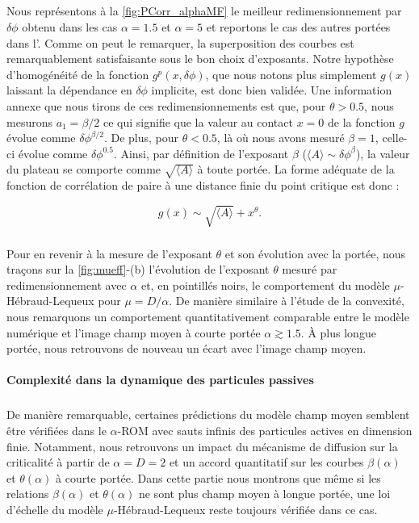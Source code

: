 \subparagraph{}Nous représentons à la \autoref{fig:PCorr_alphaMF} le meilleur redimensionnement par $\delta\phi$ obtenu dans les cas $\alpha = 1.5$ et $\alpha=5$ et reportons le cas des autres portées dans l'. Comme on peut le remarquer, la superposition des courbes est remarquablement satisfaisante sous le bon choix d'exposants. Notre hypothèse d'homogénéité de la fonction $g^p(x, \delta\phi)$, que nous notons plus simplement $g(x)$ laissant la dépendance en $\delta\phi$ implicite, est donc bien validée. Une information annexe que nous tirons de ces redimensionnements est que, pour $\theta>0.5$, nous mesurons $a_1 = \beta/2$ ce qui signifie que la valeur au contact $x=0$ de la fonction $g$ évolue comme $\delta\phi^{\beta/2}$. De plus, pour $\theta<0.5$, là où nous avons mesuré $\beta=1$, celle-ci évolue comme $\delta\phi^{0.5}$. Ainsi, par définition de l'exposant $\beta$ ($\langle A \rangle \sim \delta\phi^\beta$), la valeur du plateau se comporte comme $\sqrt{\langle A \rangle}$ à toute portée. La forme adéquate de la fonction de corrélation de paire à une distance finie du point critique est donc :

\begin{equation}
	g(x) \sim \sqrt{\langle A \rangle} + x^\theta.
	\label{eq:scalinggx}
\end{equation}

\subparagraph{}Pour en revenir à la mesure de l'exposant $\theta$ et son évolution avec la portée, nous traçons sur la \autoref{fig:mueff}-(b) l'évolution de l'exposant $\theta$ mesuré par redimensionnement avec $\alpha$ et, en pointillés noirs, le comportement du modèle $\mu$-Hébraud-Lequeux pour $\mu = D / \alpha$. De manière similaire à l'étude de la convexité, nous remarquons un comportement quantitativement comparable entre le modèle numérique et l'image champ moyen à courte portée $\alpha \gtrsim 1.5$. \`A plus longue portée, nous retrouvons de nouveau un écart avec l'image champ moyen.

\paragraph{Complexité dans la dynamique des particules passives}

\subparagraph{}De manière remarquable, certaines prédictions du modèle champ moyen semblent être vérifiées dans le $\alpha$-ROM avec sauts infinis des particules actives en dimension finie. Notamment, nous retrouvons un impact du mécanisme de diffusion sur la criticalité à partir de $\alpha = D = 2$ et un accord quantitatif sur les courbes $\beta(\alpha)$ et $\theta(\alpha)$ à courte portée. Dans cette partie nous montrons que même si les relations $\beta(\alpha)$ et $\theta(\alpha)$ ne sont plus champ moyen à longue portée, une loi d'échelle du modèle $\mu$-Hébraud-Lequeux reste toujours vérifiée dans ce cas.

